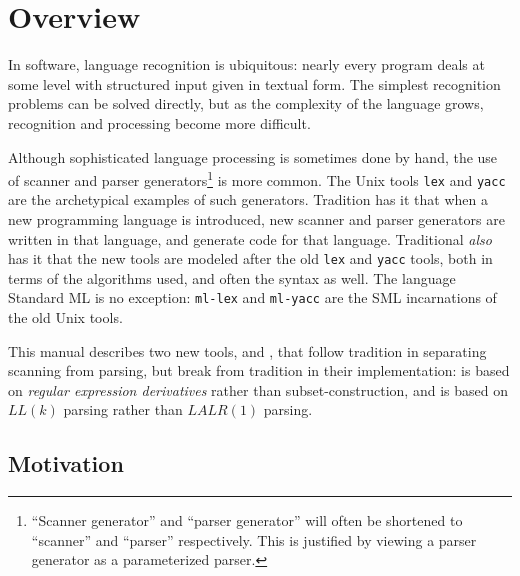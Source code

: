 \chapter{Overview}\label{chap:overview}

In software, language recognition is ubiquitous: nearly every program deals at some level with structured input given in textual form.  The simplest recognition problems can be solved directly, but as the complexity of the language grows, recognition and processing become more difficult.

Although sophisticated language processing is sometimes done by hand, the use of scanner and parser generators\footnote{
  ``Scanner generator'' and ``parser generator'' will often be shortened to ``scanner'' and ``parser'' respectively.  This is justified by viewing a parser generator as a parameterized parser.
} is more common.  The Unix tools {\tt lex} and {\tt yacc} are the archetypical examples of such generators.  Tradition has it that when a new programming language is introduced, new scanner and parser generators are written in that language, and generate code for that language.  Traditional \emph{also} has it that the new tools are modeled after the old {\tt lex} and {\tt yacc} tools, both in terms of the algorithms used, and often the syntax as well.  The language Standard ML is no exception: {\tt ml-lex} and {\tt ml-yacc} are the SML incarnations of the old Unix tools.

This manual describes two new tools, \ulex{} and \mlantlr{}, that follow tradition in separating scanning from parsing, but break from tradition in their implementation: \ulex{} is based on \emph{regular expression derivatives} rather than subset-construction, and \mlantlr{} is based on $LL(k)$ parsing rather than $LALR(1)$ parsing.

\section{Motivation}

